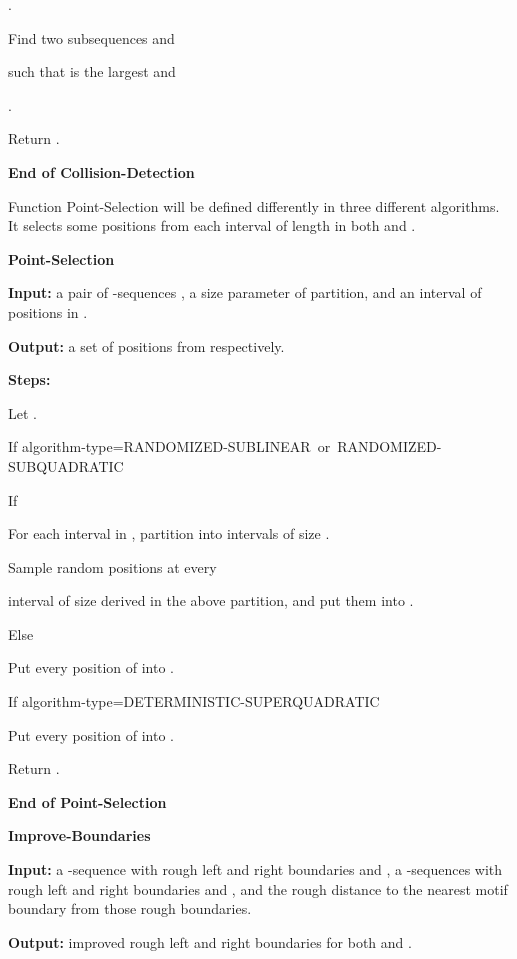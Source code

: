 \documentclass[11pt]{article}
\newcommand{\algtype}{{\rm algorithm-type}}
\newcommand{\sublinear}{{\rm RANDOMIZED-SUBLINEAR}}
\newcommand{\randomized}{{\rm RANDOMIZED-SUBQUADRATIC}}
\newcommand{\deterministic}{{\rm DETERMINISTIC-SUPERQUADRATIC}}
\begin{document}
\qquad .

\qquad Find two subsequences  and

\qquad  such that  is
the largest and

\qquad .


\qquad Return .

{\bf End of Collision-Detection}

Function Point-Selection will be defined differently in
three different algorithms. It selects some positions from each
interval of length  in both  and .




\vskip 10pt {\bf Point-Selection}

{\bf Input:} a pair of -sequences ,  a size
parameter  of partition, and an interval of positions  in .

{\bf Output:} a set  of positions from  respectively.


 {\bf Steps:}

Let .


If \algtype=\sublinear~or~\randomized

\qquad If 


\qquad\qquad For each interval  in , partition   into
intervals of size .

\qquad\qquad  Sample  random positions at every

\qquad\qquad\qquad\qquad interval of size  derived in the above
partition, and put them into .

\qquad Else

\qquad\qquad Put every position  of  into .

If \algtype=\deterministic

\qquad\qquad Put every position  of  into .

Return .



{\bf End of Point-Selection}













\vskip 10pt {\bf Improve-Boundaries}

{\bf Input:} a -sequence  with rough left
and right boundaries  and , a
-sequences  with rough left and right
boundaries  and , and the rough distance  to the
nearest motif boundary from those rough boundaries.


{\bf Output:} improved rough left and right boundaries for both
 and .
\end{document}
